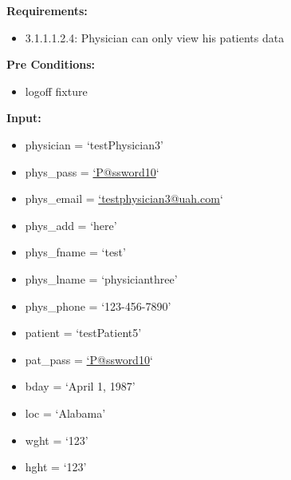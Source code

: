 \documentclass[letterpaper,10pt,english]{sphinxmanual}
\begin{document}

\begin{fulllineitems}
\label{STD/test_security:test_security.test_physician_to_patient}
\textbf{Requirements:}
\begin{itemize}
\item {} 
3.1.1.1.2.4: Physician can only view his patients data

\end{itemize}

\textbf{Pre Conditions:}
\begin{itemize}
\item {} 
logoff fixture

\end{itemize}

\textbf{Input:}
\begin{itemize}
\item {} 
physician = `testPhysician3'

\item {} 
phys\_pass = \href{mailto:'P@ssword10}{`P@ssword10}`

\item {} 
phys\_email = \href{mailto:'testphysician3@uah.com}{`testphysician3@uah.com}`

\item {} 
phys\_add = `here'

\item {} 
phys\_fname = `test'

\item {} 
phys\_lname = `physicianthree'

\item {} 
phys\_phone = `123-456-7890'

\item {} 
patient = `testPatient5'

\item {} 
pat\_pass = \href{mailto:'P@ssword10}{`P@ssword10}`

\item {} 
bday = `April 1, 1987'

\item {} 
loc = `Alabama'

\item {} 
wght = `123'

\item {} 
hght = `123'


\end{itemize}
\end{fulllineitems}
\end{document}
